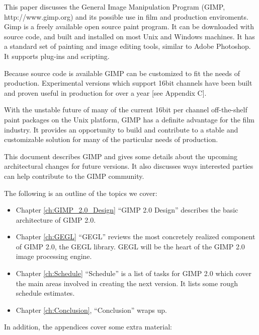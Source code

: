 This paper discusses the General Image Manipulation Program (GIMP,
http://www.gimp.org) and its possible use in film and production enviroments.
Gimp is a freely available open source paint program. It can be downloaded with
source code, and built and installed on most Unix and Windows machines.  It has
a standard set of painting and image editing tools, similar to Adobe Photoshop.
It supports plug-ins and scripting.

Because source code is available GIMP can be customized to fit the needs of
production. Experimental versions which support 16bit channels have been built
and proven useful in production for over a year [see Appendix C].

With the unstable future of many of the current 16bit per channel off-the-shelf
paint packages on the Unix platform, GIMP has a definite advantage for the film
industry. It provides an opportunity to build and contribute to a stable and
customizable solution for many of the particular needs of production. 

This document describes GIMP and gives some details about the upcoming
architectural changes for future versions. It also discusses ways interested
parties can help contribute to the GIMP community. 

The following is an outline of the topics we cover:

\begin{itemize}

\item Chapter \ref{ch:GIMP_2.0_Design} ``GIMP 2.0 Design'' describes 
the basic architecture of GIMP 2.0.

\item Chapter \ref{ch:GEGL} ``GEGL'' reviews the most concretely realized 
component of GIMP 2.0, the GEGL library. GEGL will be the heart of
the GIMP 2.0 image processing engine.

\item Chapter \ref{ch:Schedule} ``Schedule'' is a list of tasks for GIMP 2.0 which
cover the main areas involved in creating the next version. It lists some rough schedule
estimates.  

\item Chapter \ref{ch:Conclusion}, ``Conclusion'' wraps up. 

\end{itemize}

In addition, the appendices cover some extra material:

